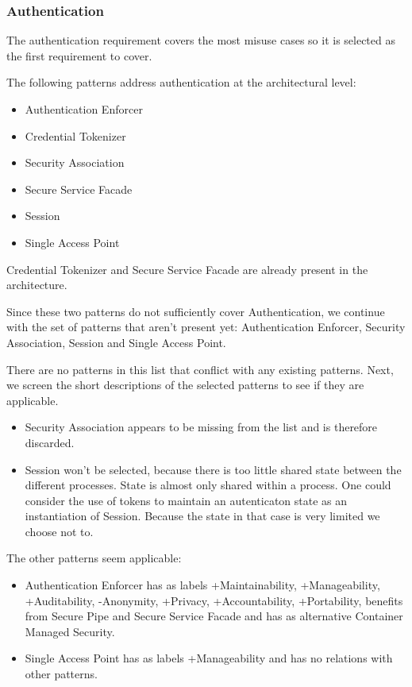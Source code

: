 \documentclass[a4paper,11pt]{report}
\begin{document}
\subsubsection{Authentication}
\label{ArchitectureAuthentication}
The authentication requirement covers the most misuse cases so it is selected as the first requirement to cover.

The following patterns address authentication at the architectural level:
\begin{itemize}
\item Authentication Enforcer
\item Credential Tokenizer
\item Security Association
\item Secure Service Facade
\item Session
\item Single Access Point
\end{itemize}

Credential Tokenizer and Secure Service Facade are already present in the architecture.

Since these two patterns do not sufficiently cover Authentication, we continue with the set of patterns that aren't
present yet: Authentication Enforcer, Security Association, Session and Single Access Point.

There are no patterns in this list that conflict with any existing patterns.
Next, we screen the short descriptions of the selected patterns to see if they are applicable.
\begin{itemize}
\item Security Association appears to be missing from the list and is therefore discarded.
\item Session won't be selected, because there is too little shared state between the different processes. State is almost only shared within a process. One could consider the use of tokens to maintain an autenticaton state as an instantiation of Session. Because the state in that case is very limited we choose not to.
\end{itemize}

The other patterns seem applicable:
\begin{itemize}
\item Authentication Enforcer has as labels +Maintainability, +Manageability, +Auditability, -Anonymity, +Privacy,
+Accountability, +Portability, benefits from Secure Pipe and Secure Service Facade and has as alternative
Container Managed Security.
\item Single Access Point has as labels +Manageability and has no relations with other patterns.
\end{itemize}
\end{document}
